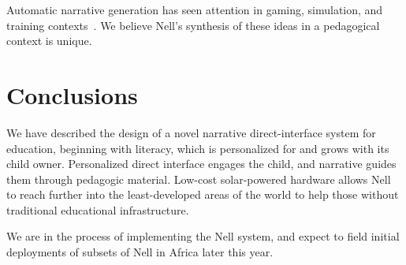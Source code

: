 \documentclass[preprint]{sig-alternate}
\begin{document}
Automatic narrative generation has seen attention in
gaming, simulation, and training contexts~\cite{riedl:2008}.
We believe
Nell's synthesis of these ideas in a pedagogical context is unique.

\section{Conclusions}
We have described the design of a novel narrative direct-interface
system for education, beginning with literacy, which is personalized for and grows with
its child owner.  Personalized direct interface engages the child, and
narrative guides them through pedagogic material.  Low-cost
solar-powered hardware allows Nell to reach further into the
least-developed areas of the world to help those without traditional
educational infrastructure.

We are in the process of implementing the Nell system, and expect to
field initial deployments of subsets of Nell in Africa later this year.



%

%
%
\balancecolumns
\end{document}
